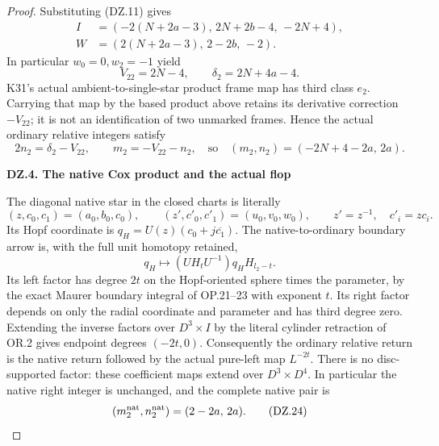 \begin{proof}
Substituting (DZ.11) gives
\[
 \begin{split}
 I&=(-2(N+2a-3),\,2N+2b-4,\,-2N+4),\\
 W&=(2(N+2a-3),\,2-2b,\,-2).
 \end{split}                                          \tag{DZ.20}
\]
In particular \(w_0=0,w_2=-1\) yield
\[
                  V_{22}=2N-4,\qquad
                  \delta_2=2N+4a-4.                 \tag{DZ.21}
\]
K31's actual ambient-to-single-star product frame map has third
class \(e_2\). Carrying that map by the based product above retains
its derivative correction \(-V_{22}\); it is not an identification
of two unmarked frames. Hence the actual ordinary relative
integers satisfy
\[
 2n_2=\delta_2-V_{22},\qquad m_2=-V_{22}-n_2,
 \quad\text{so}\quad
           (m_2,n_2)=(-2N+4-2a,\,2a).               \tag{DZ.22}
\]

\par

\medskip\noindent\textbf{DZ.4. The native Cox product and the actual flop}

\par\nobreak

The diagonal native star in the closed charts is literally
\[
 (z,c_0,c_1)=(a_0,b_0,c_0),\qquad
 (z',c'_0,c'_1)=(u_0,v_0,w_0),\qquad
                  z'=z^{-1},\quad c'_i=zc_i.
\]
Its Hopf coordinate is
\(q_H=U(z)(c_0+j\overline{c_1})\).
The native-to-ordinary boundary arrow is, with the full unit
homotopy retained,
\[
 q_H\longmapsto
       (U H_t U^{-1})q_H H_{l_2-t}.                 \tag{DZ.23}
\]
Its left factor has degree \(2t\) on the Hopf-oriented sphere
times the parameter, by the exact Maurer boundary integral of
OP.21--23 with exponent \(t\). Its right factor depends on only
the radial coordinate and parameter and has third degree zero.
Extending the inverse factors over \(D^3\times I\) by the
literal cylinder retraction of OR.2 gives endpoint degrees
\((-2t,0)\). Consequently the ordinary relative return is the
native return followed by the actual pure-left map \(L^{-2t}\).
There is no disc-supported factor: these coefficient maps extend
over \(D^3\times D^4\). In particular the native right integer is
unchanged, and the complete native pair is
\[
                        (m_2^{\rm nat},n_2^{\rm nat})
                                      =(2-2a,\,2a). \tag{DZ.24}
\]


\end{proof}
